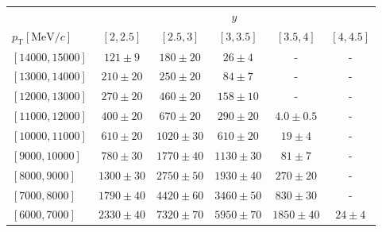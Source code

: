 \renewcommand{\arraystretch}{1.0}
\begin{tabular}{lr@{\hskip+0.2em}c@{\hskip+0.2em}r@{\hskip+0.2em}c@{\hskip+0.2em}rr@{\hskip+0.2em}c@{\hskip+0.2em}r@{\hskip+0.2em}c@{\hskip+0.2em}rr@{\hskip+0.2em}c@{\hskip+0.2em}r@{\hskip+0.2em}c@{\hskip+0.2em}rr@{\hskip+0.2em}c@{\hskip+0.2em}r@{\hskip+0.2em}c@{\hskip+0.2em}rr@{\hskip+0.2em}c@{\hskip+0.2em}r@{\hskip+0.2em}c@{\hskip+0.2em}r}
\toprule&\multicolumn{25}{c}{$y$}\\
$p_{\text{T}} [\text{MeV}/c]$ & \multicolumn{5}{c}{$[2,2.5]$} & \multicolumn{5}{c}{$[2.5,3]$} & \multicolumn{5}{c}{$[3,3.5]$} & \multicolumn{5}{c}{$[3.5,4]$} & \multicolumn{5}{c}{$[4,4.5]$} \\
\midrule$[14000,15000]$ & \multicolumn{5}{c}{$121 \pm 9$} & \multicolumn{5}{c}{$180 \pm 20$} & \multicolumn{5}{c}{$26 \pm 4$} & \multicolumn{5}{c}{-} & \multicolumn{5}{c}{-} \\
$[13000,14000]$ & \multicolumn{5}{c}{$210 \pm 20$} & \multicolumn{5}{c}{$250 \pm 20$} & \multicolumn{5}{c}{$84 \pm 7$} & \multicolumn{5}{c}{-} & \multicolumn{5}{c}{-} \\
$[12000,13000]$ & \multicolumn{5}{c}{$270 \pm 20$} & \multicolumn{5}{c}{$460 \pm 20$} & \multicolumn{5}{c}{$158 \pm 10$} & \multicolumn{5}{c}{-} & \multicolumn{5}{c}{-} \\
$[11000,12000]$ & \multicolumn{5}{c}{$400 \pm 20$} & \multicolumn{5}{c}{$670 \pm 20$} & \multicolumn{5}{c}{$290 \pm 20$} & \multicolumn{5}{c}{$4.0 \pm 0.5$} & \multicolumn{5}{c}{-} \\
$[10000,11000]$ & \multicolumn{5}{c}{$610 \pm 20$} & \multicolumn{5}{c}{$1020 \pm 30$} & \multicolumn{5}{c}{$610 \pm 20$} & \multicolumn{5}{c}{$19 \pm 4$} & \multicolumn{5}{c}{-} \\
$[9000,10000]$ & \multicolumn{5}{c}{$780 \pm 30$} & \multicolumn{5}{c}{$1770 \pm 40$} & \multicolumn{5}{c}{$1130 \pm 30$} & \multicolumn{5}{c}{$81 \pm 7$} & \multicolumn{5}{c}{-} \\
$[8000,9000]$ & \multicolumn{5}{c}{$1300 \pm 30$} & \multicolumn{5}{c}{$2750 \pm 50$} & \multicolumn{5}{c}{$1930 \pm 40$} & \multicolumn{5}{c}{$270 \pm 20$} & \multicolumn{5}{c}{-} \\
$[7000,8000]$ & \multicolumn{5}{c}{$1790 \pm 40$} & \multicolumn{5}{c}{$4420 \pm 60$} & \multicolumn{5}{c}{$3460 \pm 50$} & \multicolumn{5}{c}{$830 \pm 30$} & \multicolumn{5}{c}{-} \\
$[6000,7000]$ & \multicolumn{5}{c}{$2330 \pm 40$} & \multicolumn{5}{c}{$7320 \pm 70$} & \multicolumn{5}{c}{$5950 \pm 70$} & \multicolumn{5}{c}{$1850 \pm 40$} & \multicolumn{5}{c}{$24 \pm 4$} \\

\end{tabular}
